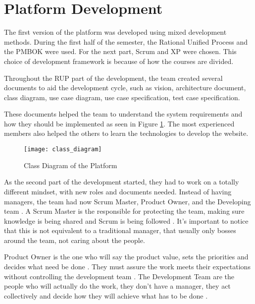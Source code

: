 
\section{Platform Development}
\label{sec:platform_development}

The first version of the platform was developed using mixed development methods. During the first half of the semester, the Rational Unified Process and the PMBOK were used. For the next part, Scrum and XP were chosen. This choice of development framework is because of how the courses are divided.

Throughout the RUP part of the development, the team created several documents to aid the development cycle, such as vision, architecture document, class diagram, use case diagram, use case specification, test case specification.

These documents helped the team to understand the system requirements and how they should be implemented as seen in Figure \ref{fig:class_diagram}. The most experienced members also helped the others to learn the technologies to develop the website.


\begin{figure}[h!]
\centering
\texttt{[image: class\_diagram]}
\caption{Class Diagram of the Platform \cite{plataforma2017arquitetura}}
\label{fig:class_diagram}
\end{figure}

As the second part of the development started, they had to work on a totally different mindset, with new roles and documents needed. Instead of having managers, the team had now Scrum Master, Product Owner, and the Developing team \cite{cohen2003agile}. A Scrum Master is the responsible for protecting the team, making sure knowledge is being shared and Scrum is being followed \cite{scrumalliance2017}. It's important to notice that this is not equivalent to a traditional manager, that usually only bosses around the team, not caring about the people.

Product Owner is the one who will say the product value, sets the priorities and decides what need be done \cite{agile422017}. They must assure the work meets their expectations without controlling the development team \cite{schwaber2002agile}. The Development Team are the people who will actually do the work, they don't have a manager, they act collectively and decide how they will achieve what has to be done \cite{greer2011agile}.


